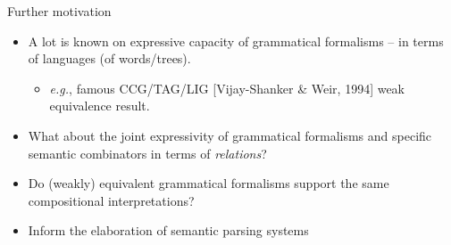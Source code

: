 \documentclass{beamer}
\newcommand{\hidden}[1]{}
\begin{document}
\begin{frame}{Further motivation}
  
    \begin{itemize}
    \item A lot is known on expressive capacity of grammatical formalisms -- in terms of languages (of words/trees).
      \begin{itemize}
      \item \emph{e.g.}, famous CCG/TAG/LIG [Vijay-Shanker \& Weir, 1994] weak equivalence result.
      \end{itemize}
    \item What about the joint expressivity of grammatical formalisms and specific semantic combinators in terms of \emph{relations}?
    \item \alert{Do (weakly) equivalent grammatical formalisms support the same compositional interpretations?}
    \item Inform the elaboration of semantic parsing systems
    \end{itemize} 
\end{frame}

\hidden{
\begin{block}{Questions}
    \begin{itemize}
    \item Quel type de syntaxe pour quel type de s\'emantique?
    \item Est-ce que des formalismes syntaxiques qui d\'ecrivent les m\^emes langages supportent les m\^emes interpr\'etations compositionnelles?
    \end{itemize}
  \end{block}
\end{frame}
}

\hidden{
\begin{frame}{Main contribution}
    \textbf{Compositional mechanisms of semantic interpretation which are both projective and with bounded memory are strictly less expressive than compositional non-projective ones with bounded memory.}

  
\end{frame}
}
\end{document}
